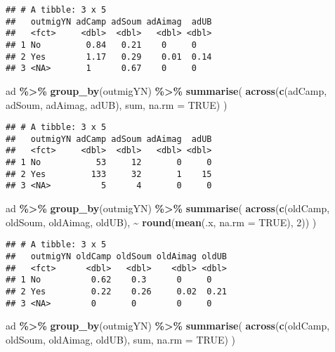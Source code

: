 \documentclass[
]{article}
\newenvironment{Shaded}{\begin{snugshade}}{\end{snugshade}}
\newcommand{\AttributeTok}[1]{\textcolor[rgb]{0.13,0.29,0.53}{#1}}
\newcommand{\ConstantTok}[1]{\textcolor[rgb]{0.56,0.35,0.01}{#1}}
\newcommand{\DecValTok}[1]{\textcolor[rgb]{0.00,0.00,0.81}{#1}}
\newcommand{\FunctionTok}[1]{\textcolor[rgb]{0.13,0.29,0.53}{\textbf{#1}}}
\newcommand{\NormalTok}[1]{#1}
\newcommand{\SpecialCharTok}[1]{\textcolor[rgb]{0.81,0.36,0.00}{\textbf{#1}}}
\begin{document}
\begin{verbatim}
## # A tibble: 3 x 5
##   outmigYN adCamp adSoum adAimag  adUB
##   <fct>     <dbl>  <dbl>   <dbl> <dbl>
## 1 No         0.84   0.21    0     0   
## 2 Yes        1.17   0.29    0.01  0.14
## 3 <NA>       1      0.67    0     0
\end{verbatim}

\begin{Shaded}
\begin{Highlighting}[]
\NormalTok{ad }\SpecialCharTok{\%\textgreater{}\%} 
  \FunctionTok{group\_by}\NormalTok{(outmigYN) }\SpecialCharTok{\%\textgreater{}\%}
  \FunctionTok{summarise}\NormalTok{(}
    \FunctionTok{across}\NormalTok{(}\FunctionTok{c}\NormalTok{(adCamp, adSoum, adAimag, adUB), sum, }\AttributeTok{na.rm =} \ConstantTok{TRUE}\NormalTok{)}
\NormalTok{  ) }
\end{Highlighting}
\end{Shaded}

\begin{verbatim}
## # A tibble: 3 x 5
##   outmigYN adCamp adSoum adAimag  adUB
##   <fct>     <dbl>  <dbl>   <dbl> <dbl>
## 1 No           53     12       0     0
## 2 Yes         133     32       1    15
## 3 <NA>          5      4       0     0
\end{verbatim}

\begin{Shaded}
\begin{Highlighting}[]
\NormalTok{ad }\SpecialCharTok{\%\textgreater{}\%} 
  \FunctionTok{group\_by}\NormalTok{(outmigYN) }\SpecialCharTok{\%\textgreater{}\%}
  \FunctionTok{summarise}\NormalTok{(}
    \FunctionTok{across}\NormalTok{(}\FunctionTok{c}\NormalTok{(oldCamp, oldSoum, oldAimag, oldUB), }\SpecialCharTok{\textasciitilde{}} \FunctionTok{round}\NormalTok{(}\FunctionTok{mean}\NormalTok{(.x, }\AttributeTok{na.rm =} \ConstantTok{TRUE}\NormalTok{), }\DecValTok{2}\NormalTok{))}
\NormalTok{  ) }
\end{Highlighting}
\end{Shaded}

\begin{verbatim}
## # A tibble: 3 x 5
##   outmigYN oldCamp oldSoum oldAimag oldUB
##   <fct>      <dbl>   <dbl>    <dbl> <dbl>
## 1 No          0.62    0.3      0     0   
## 2 Yes         0.22    0.26     0.02  0.21
## 3 <NA>        0       0        0     0
\end{verbatim}

\begin{Shaded}
\begin{Highlighting}[]
\NormalTok{ad }\SpecialCharTok{\%\textgreater{}\%} 
  \FunctionTok{group\_by}\NormalTok{(outmigYN) }\SpecialCharTok{\%\textgreater{}\%}
  \FunctionTok{summarise}\NormalTok{(}
    \FunctionTok{across}\NormalTok{(}\FunctionTok{c}\NormalTok{(oldCamp, oldSoum, oldAimag, oldUB), sum, }\AttributeTok{na.rm =} \ConstantTok{TRUE}\NormalTok{)}
\NormalTok{  ) }
\end{Highlighting}
\end{Shaded}
\end{document}
